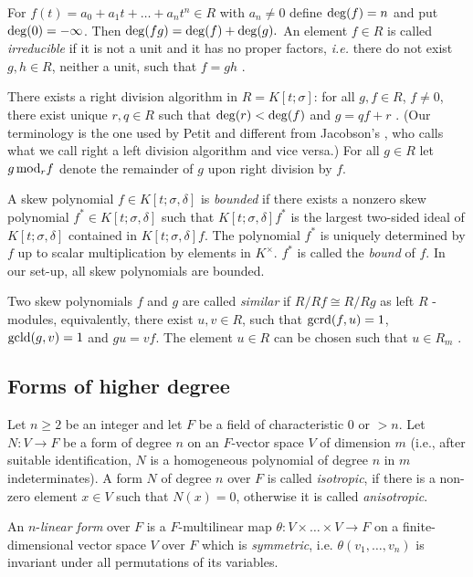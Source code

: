 \documentclass[12pt]{amsart}
\theoremstyle{plain}
\theoremstyle{definition}
\numberwithin{equation}{section}
\numberwithin{figure}{section}
\begin{document}
For $f(t)=a_0+a_1t+\dots +a_nt^n\in R$ with $a_n\not=0$ define ${\rm
deg}(f)=n$ and put ${\rm deg}(0)=-\infty$. Then ${\rm deg}(fg)={\rm deg}
(f)+{\rm deg}(g).$
 An element $f\in R$ is called \emph{irreducible} if  it is not a unit and it has no proper factors, \emph{i.e.} there do not exist
 $g,h\in R$, neither a unit, such that $f=gh$ \cite[p.~2 ff.]{J96}.

 There exists a right division algorithm in $R=K[t;\sigma]$: for all $g,f\in R$, $f\neq 0$, there exist unique $r,q\in R$
  such that ${\rm deg}(r)<{\rm deg}(f)$ and $g=qf+r$ \cite[\S1.1]{J96}.
(Our terminology is the one used by Petit \cite{P66} and
 different from Jacobson's \cite{J96}, who calls what we call right a left division algorithm and vice versa.)
 For all $g \in R$ let $g\, {\rm mod}_r f$ denote the remainder of $g$ upon right division by $f$.


  A skew polynomial  $f\in K[t;\sigma,\delta]$ is  \emph{bounded} if there exists a nonzero skew polynomial
  $f^*  \in K[t;\sigma,\delta]$ such that $K[t;\sigma,\delta]f^* $ is the largest two-sided ideal of $K[t;\sigma,\delta]$ contained in
  $K[t;\sigma,\delta]f$. The polynomial $f^* $ is uniquely determined by $f$ up to scalar multiplication by elements in $K^\times$. $f^*$ is called the \emph{bound} of $f$. In our set-up, all skew polynomials are bounded.

  Two skew polynomials $f$ and $g$ are called \emph{similar} if $R/Rf\cong R/Rg$ as left $R$ -modules, equivalently, there exist $u,v\in R$, such that ${\rm  gcrd}(f,u)=1$, ${\rm gcld}(g,v)=1$ and $gu=vf$. The element $u\in R$ can be chosen such that $u\in R_m$ \cite[p.~15]{J96}.

\subsection{Forms of higher degree}

Let $n\geq 2$ be an integer and let $F$ be a field of characteristic 0 or $>n$.
 Let $N:V\to F$ be a  form of degree $n$ on an $F$-vector space
$V$ of dimension $m$ (i.e., after suitable identification, $N$ is a homogeneous polynomial of degree $n$
in $m$ indeterminates).
A form $N$ of degree $n$ over $F$ is called {\it isotropic},
if there is a non-zero element $x\in V$ such that $N(x)=0$, otherwise it is called {\it anisotropic}.

 An $n$-{\it linear form} over $F$ is a $F$-multilinear map $\theta : V \times
\dots \times V \to F$ on a finite-dimensional vector space $V$ over $F$ which is {\it symmetric}, i.e. $\theta (v_1,
\dots, v_n)$ is invariant under all permutations of its variables.
\end{document}
